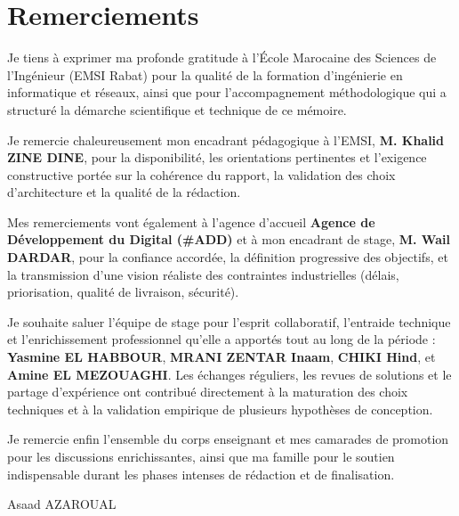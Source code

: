 \chapter*{Remerciements}
{}

Je tiens à exprimer ma profonde gratitude à l'École Marocaine des Sciences de l'Ingénieur (EMSI Rabat) pour la qualité de la formation d'ingénierie en informatique et réseaux, ainsi que pour l'accompagnement méthodologique qui a structuré la démarche scientifique et technique de ce mémoire.

Je remercie chaleureusement mon encadrant pédagogique à l'EMSI, \textbf{M. Khalid ZINE DINE}, pour la disponibilité, les orientations pertinentes et l'exigence constructive portée sur la cohérence du rapport, la validation des choix d'architecture et la qualité de la rédaction.

Mes remerciements vont également à l'agence d'accueil \textbf{Agence de Développement du Digital (\#ADD)} et à mon encadrant de stage, \textbf{M. Wail DARDAR}, pour la confiance accordée, la définition progressive des objectifs, et la transmission d'une vision réaliste des contraintes industrielles (délais, priorisation, qualité de livraison, sécurité).

Je souhaite saluer l'équipe de stage pour l'esprit collaboratif, l'entraide technique et l'enrichissement professionnel qu'elle a apportés tout au long de la période : \textbf{Yasmine EL HABBOUR}, \textbf{MRANI ZENTAR Inaam}, \textbf{CHIKI Hind}, et \textbf{Amine EL MEZOUAGHI}. Les échanges réguliers, les revues de solutions et le partage d'expérience ont contribué directement à la maturation des choix techniques et à la validation empirique de plusieurs hypothèses de conception.

Je remercie enfin l'ensemble du corps enseignant et mes camarades de promotion pour les discussions enrichissantes, ainsi que ma famille pour le soutien indispensable durant les phases intenses de rédaction et de finalisation.

\vspace{1cm}
\hfill Asaad AZAROUAL

\cleardoublepage